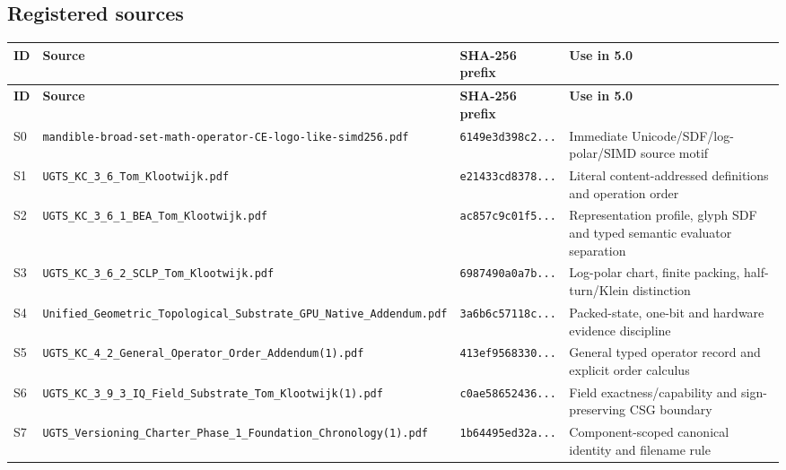 \documentclass[11pt,a4paper]{article}
\begin{document}
\subsection{Registered sources}
\small
{}
\begin{longtable}{P{7mm}P{47mm}P{34mm}P{67mm}}
\toprule
\textbf{ID} & \textbf{Source} & \textbf{SHA-256 prefix} & \textbf{Use in 5.0}\\
\midrule
\endfirsthead
\toprule
\textbf{ID} & \textbf{Source} & \textbf{SHA-256 prefix} & \textbf{Use in 5.0}\\
\midrule
\endhead
\bottomrule
\endlastfoot
S0 & \nolinkurl{mandible-broad-set-math-operator-CE-logo-like-simd256.pdf} & \texttt{6149e3d398c2...} & Immediate Unicode/SDF/log-polar/SIMD source motif \\
S1 & \nolinkurl{UGTS_KC_3_6_Tom_Klootwijk.pdf} & \texttt{e21433cd8378...} & Literal content-addressed definitions and operation order \\
S2 & \nolinkurl{UGTS_KC_3_6_1_BEA_Tom_Klootwijk.pdf} & \texttt{ac857c9c01f5...} & Representation profile, glyph SDF and typed semantic evaluator separation \\
S3 & \nolinkurl{UGTS_KC_3_6_2_SCLP_Tom_Klootwijk.pdf} & \texttt{6987490a0a7b...} & Log-polar chart, finite packing, half-turn/Klein distinction \\
S4 & \nolinkurl{Unified_Geometric_Topological_Substrate_GPU_Native_Addendum.pdf} & \texttt{3a6b6c57118c...} & Packed-state, one-bit and hardware evidence discipline \\
S5 & \nolinkurl{UGTS_KC_4_2_General_Operator_Order_Addendum(1).pdf} & \texttt{413ef9568330...} & General typed operator record and explicit order calculus \\
S6 & \nolinkurl{UGTS_KC_3_9_3_IQ_Field_Substrate_Tom_Klootwijk(1).pdf} & \texttt{c0ae58652436...} & Field exactness/capability and sign-preserving CSG boundary \\
S7 & \nolinkurl{UGTS_Versioning_Charter_Phase_1_Foundation_Chronology(1).pdf} & \texttt{1b64495ed32a...} & Component-scoped canonical identity and filename rule \\
\end{longtable}
\normalsize
\end{document}
